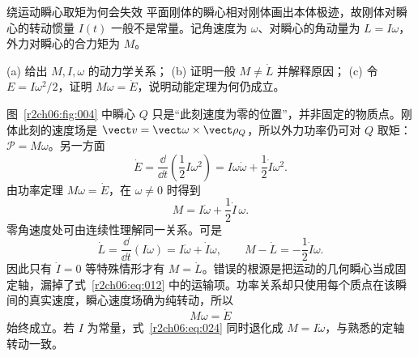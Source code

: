 \begin{practicebox}{绕运动瞬心取矩为何会失效}
平面刚体的瞬心相对刚体画出本体极迹，故刚体对瞬心的转动惯量 $I(t)$ 一般不是常量。记角速度为 $\omega$、对瞬心的角动量为 $L=I\omega$，外力对瞬心的合力矩为 $M$。

(a) 给出 $M,I,\omega$ 的动力学关系；
(b) 证明一般 $M\ne\dot L$ 并解释原因；
(c) 令 $E=I\omega^2/2$，证明 $M\omega=\dot E$，说明动能定理为何仍成立。
\label{r2ch06:pr:002}
\begin{solution}
图~\ref{r2ch06:fig:004} 中瞬心 $Q$ 只是“此刻速度为零的位置”，并非固定的物质点。刚体此刻的速度场是 $\vect v=\vect\omega\times\vect\rho_Q$，所以外力功率仍可对 $Q$ 取矩：$\mathcal P=M\omega$。另一方面
\begin{equation}
 \dot E=\frac{\dd}{\dd t}\left(\frac12I\omega^2\right)
 =I\omega\dot\omega+\frac12\dot I\omega^2.
 \label{r2ch06:eq:023}
\end{equation}
由功率定理 $M\omega=\dot E$，在 $\omega\ne0$ 时得到
\begin{equation}
 \boxed{M=I\dot\omega+\frac12\dot I\,\omega}.
 \label{r2ch06:eq:024}
\end{equation}
零角速度处可由连续性理解同一关系。可是
\begin{equation}
 \dot L=\frac{\dd}{\dd t}(I\omega)
 =I\dot\omega+\dot I\omega,\qquad
 \boxed{M-\dot L=-\frac12\dot I\omega}.
 \label{r2ch06:eq:025}
\end{equation}
因此只有 $\dot I=0$ 等特殊情形才有 $M=\dot L$。错误的根源是把运动的几何瞬心当成固定轴，漏掉了式~\eqref{r2ch06:eq:012} 中的运输项。功率关系却只使用每个质点在该瞬间的真实速度，瞬心速度场确为纯转动，所以
\begin{equation}
 \boxed{M\omega=\dot E}
 \label{r2ch06:eq:026}
\end{equation}
始终成立。若 $I$ 为常量，式~\eqref{r2ch06:eq:024} 同时退化成 $M=I\dot\omega$，与熟悉的定轴转动一致。
\figInstantPole
\end{solution}
\end{practicebox}

